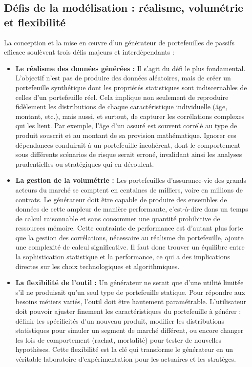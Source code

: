 \subsection{Défis de la modélisation : réalisme, volumétrie et flexibilité}

La conception et la mise en œuvre d'un générateur de portefeuilles de passifs efficace soulèvent trois défis majeurs et interdépendants :

\begin{itemize}
\item \textbf{Le réalisme des données générées :} Il s'agit du défi le plus fondamental. L'objectif n'est pas de produire des données aléatoires, mais de créer un portefeuille synthétique dont les propriétés statistiques sont indiscernables de celles d'un portefeuille réel. Cela implique non seulement de reproduire fidèlement les distributions de chaque caractéristique individuelle (âge, montant, etc.), mais aussi, et surtout, de capturer les corrélations complexes qui les lient. Par exemple, l'âge d'un assuré est souvent corrélé au type de produit souscrit et au montant de sa provision mathématique. Ignorer ces dépendances conduirait à un portefeuille incohérent, dont le comportement sous différents scénarios de risque serait erroné, invalidant ainsi les analyses prudentielles ou stratégiques qui en découlent.

\item \textbf{La gestion de la volumétrie :} Les portefeuilles d'assurance-vie des grands acteurs du marché se comptent en centaines de milliers, voire en millions de contrats. Le générateur doit être capable de produire des ensembles de données de cette ampleur de manière performante, c'est-à-dire dans un temps de calcul raisonnable et sans consommer une quantité prohibitive de ressources mémoire. Cette contrainte de performance est d'autant plus forte que la gestion des corrélations, nécessaire au réalisme du portefeuille, ajoute une complexité de calcul significative. Il faut donc trouver un équilibre entre la sophistication statistique et la performance, ce qui a des implications directes sur les choix technologiques et algorithmiques.

\item \textbf{La flexibilité de l'outil :} Un générateur ne serait que d'une utilité limitée s'il ne produisait qu'un seul type de portefeuille statique. Pour répondre aux besoins métiers variés, l'outil doit être hautement paramétrable. L'utilisateur doit pouvoir ajuster finement les caractéristiques du portefeuille à générer : définir les spécificités d'un nouveau produit, modifier les distributions statistiques pour simuler un segment de marché différent, ou encore changer les lois de comportement (rachat, mortalité) pour tester de nouvelles hypothèses. Cette flexibilité est la clé qui transforme le générateur en un véritable laboratoire d'expérimentation pour les actuaires et les stratèges.
\end{itemize}

